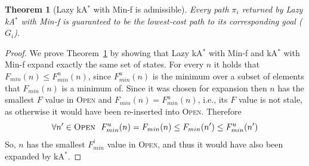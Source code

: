 \documentclass{aicom2e}
\newtheorem{theorem}{Theorem}
\newcommand{\kastar}{kA$^*$}
\newcommand{\minf}{Min-f}
\newcommand{\open}{\textsc{Open}}
\begin{document}
\begin{theorem}[Lazy \kastar{} with \minf{} is admissible]
Every path $\pi_i$ returned by Lazy \kastar{} with \minf{} is guaranteed to be the lowest-cost path to its corresponding goal ($G_i$).
\label{the:lazy-minf-correct}
\end{theorem}
\begin{proof}
	We prove Theorem~\ref{the:lazy-minf-correct} by showing that Lazy \kastar{} with \minf{} and \kastar{} with \minf{} expand exactly the same set of states. For every $n$ it holds that $F_{min}(n)\leq F^u_{min}(n)$, since $F^u_{min}(n)$ is the minimum over a subset of elements that $F_{min}(n)$ is a minimum of. 
	Since it was chosen for expansion then $n$ has the smallest $F$ value in \open{}
	and $F_{min}(n)=F^u_{min}(n)$, i.e., its $F$ value is not stale, as otherwise it would have been re-inserted into \open{}. Therefore 
	\[ \forall n'\in\open{} ~~ F^u_{min}(n)=F_{min}(n)\leq F_{min}(n') \leq F^u_{min}(n') \]
	So, $n$ has the smallest $F^i_{min}$ value in \open{}, and thus it would have also been expanded by \kastar{}. 
\end{proof}

	


\end{document}

